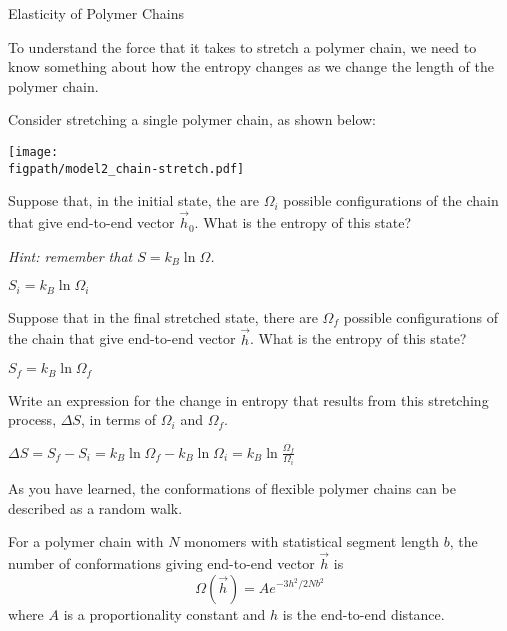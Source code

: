 \begin{activity}{Elasticity of Polymer Chains}
\begin{ctqs}
\end{ctqs}

\begin{model}
\label{\labelbase:mdl:chainstretch}
	To understand the force that it takes to stretch a polymer chain, we need to know something about how the entropy changes as we change the length of the polymer chain.
	
	Consider stretching a single polymer chain, as shown below:
	
	\vspace{6pt}
	\centerline{\texttt{[image: \\figpath/model2\_chain-stretch.pdf]}}
\end{model}

\begin{ctqs}
	\question Suppose that, in the initial state, the are $\Omega_i$ possible configurations of the chain that give end-to-end vector $\vec h_0$.  What is the entropy of this state?
	
		\emph{Hint: remember that $S = k_B\ln\Omega$.}
		
		\begin{solution}[0.25in]{}
			$S_i = k_B\ln\Omega_i$
		\end{solution}
	
	\question Suppose that in the final stretched state, there are $\Omega_f$ possible configurations of the chain that give end-to-end vector $\vec h$.  What is the entropy of this state?
		
		\begin{solution}[0.25in]{}
			$S_f = k_B\ln\Omega_f$
		\end{solution}
	
	\question Write an expression for the change in entropy that results from this stretching process, $\Delta S$, in terms of $\Omega_i$ and $\Omega_f$. \label{\labelbase:ctq:delS}
		
		\begin{solution}[0.75in]{}
			$\Delta S = S_f - S_i = k_B\ln\Omega_f - k_B\ln\Omega_i = k_B\ln\frac{\Omega_f}{\Omega_i}$
		\end{solution}
	
\end{ctqs}

\begin{infobox}

	As you have learned, the conformations of flexible polymer chains can be described as a random walk.
	
	For a polymer chain with $N$ monomers with statistical segment length $b$, the number of conformations giving end-to-end vector $\vec h$ is
	\begin{equation*}
		\Omega(\vec h) = A e^{-3h^2/2Nb^2}
	\end{equation*}
	where $A$ is a proportionality constant and $h$ is the end-to-end distance.
	

\end{infobox}
\end{activity}
